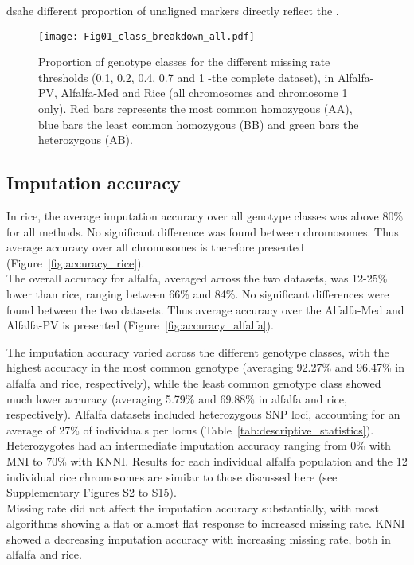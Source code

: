 dsahe different proportion of unaligned markers directly reflect the .

\begin{figure}
\texttt{[image: Fig01\_class\_breakdown\_all.pdf]}
\caption[Proportions of genotype classes]{​Proportion of genotype classes for the different missing rate thresholds (0.1, 0.2, 0.4, 0.7 and 1 -the complete dataset), in Alfalfa-PV, Alfalfa-Med and Rice (all chromosomes and chromosome 1 only). Red bars represents the most common homozygous (AA), blue bars the least common homozygous (BB) and green bars the heterozygous (AB).}
\label{fig:genotype_classes}
\end{figure}

\subsection{Imputation accuracy}
\label{sec:imputation_accuracy}  



In rice, the average imputation accuracy over all genotype classes was above 80\% for all methods. No significant difference was found between chromosomes. Thus average accuracy over all chromosomes is therefore presented (Figure~\ref{fig:accuracy_rice}). \\
The overall accuracy for alfalfa, averaged across the two datasets, was 12-25\% lower than rice, ranging between 66\% and 84\%. No significant differences were found between the two datasets. Thus average accuracy over the Alfalfa-Med and Alfalfa-PV is presented (Figure~\ref{fig:accuracy_alfalfa}).

The imputation accuracy varied across the different genotype classes, with the highest accuracy in the most common genotype (averaging 92.27\% and 96.47\% in alfalfa and rice, respectively), while the least common genotype class showed much lower accuracy (averaging 5.79\% and 69.88\% in alfalfa and rice, respectively).
Alfalfa datasets included heterozygous SNP loci, accounting for an average of 27\% of individuals per locus (Table~\ref{tab:descriptive_statistics}). Heterozygotes had an intermediate imputation accuracy ranging from 0\% with MNI to 70\% with KNNI. Results for each individual alfalfa population and the 12 individual rice chromosomes are similar to those discussed here (see Supplementary Figures S2 to S15). \\
Missing rate did not affect the imputation accuracy substantially, with most algorithms showing a flat or almost flat response to increased missing rate. KNNI showed a decreasing imputation accuracy with increasing missing rate, both in alfalfa and rice.


